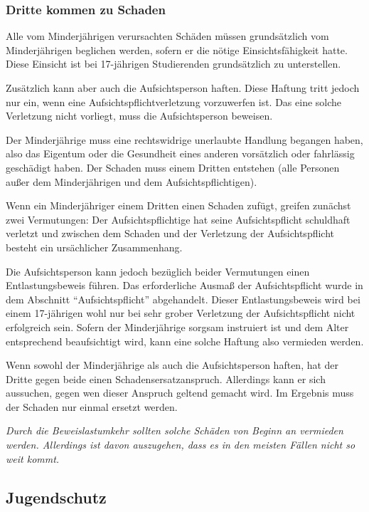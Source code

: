 \documentclass[a4paper,11pt]{scrartcl} %
\begin{document}
\subsubsection*{Dritte kommen zu Schaden}

Alle vom Minderjährigen verursachten Schäden müssen grundsätzlich vom Minderjährigen beglichen werden, sofern er die nötige Einsichtsfähigkeit hatte. Diese Einsicht ist bei 17-jährigen Studierenden grundsätzlich zu unterstellen.

Zusätzlich kann aber auch die Aufsichtsperson haften. Diese Haftung tritt jedoch nur ein, wenn eine Aufsichtspflichtverletzung vorzuwerfen ist. Das eine solche Verletzung nicht vorliegt, muss die Aufsichtsperson beweisen.

Der Minderjährige muss eine rechtswidrige unerlaubte Handlung begangen haben, also das Eigentum oder die Gesundheit eines anderen vorsätzlich oder fahrlässig geschädigt haben. Der Schaden muss einem Dritten entstehen (alle Personen außer dem Minderjährigen und dem Aufsichtspflichtigen).

Wenn ein Minderjähriger einem Dritten einen Schaden zufügt, greifen zunächst zwei Vermutungen: Der Aufsichtspflichtige hat seine Aufsichtspflicht schuldhaft verletzt und zwischen dem Schaden und der Verletzung der Aufsichtspflicht besteht ein ursächlicher Zusammenhang.

Die Aufsichtsperson kann jedoch bezüglich beider Vermutungen einen Entlastungsbeweis führen. Das erforderliche Ausmaß der Aufsichtspflicht wurde in dem Abschnitt "`Aufsichtspflicht"' abgehandelt. Dieser Entlastungsbeweis wird bei einem 17-jährigen wohl nur bei sehr grober Verletzung der Aufsichtspflicht nicht erfolgreich sein. Sofern der Minderjährige sorgsam instruiert ist und dem Alter entsprechend beaufsichtigt wird, kann eine solche Haftung also vermieden werden.

Wenn sowohl der Minderjährige als auch die Aufsichtsperson haften, hat der Dritte gegen beide einen Schadensersatzanspruch. Allerdings kann er sich aussuchen, gegen wen dieser Anspruch geltend gemacht wird. Im Ergebnis muss der Schaden nur einmal ersetzt werden.

\textit{Durch die Beweislastumkehr sollten solche Schäden von Beginn an vermieden werden. Allerdings ist davon auszugehen, dass es in den meisten Fällen nicht so weit kommt.}

\subsection{Jugendschutz}
\end{document}
